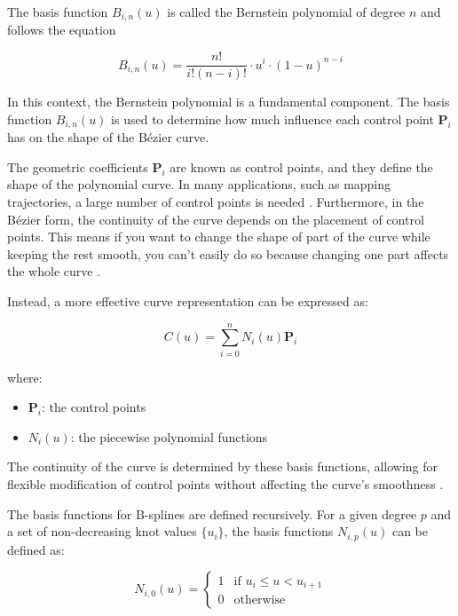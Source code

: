 The basis function \( B_{i,n}(u) \) is called the Bernstein polynomial of degree \( n \) and follows the equation

\begin{equation}
    B_{i,n}(u) = \frac{n!}{i!(n - i)!} \cdot u^i \cdot (1 - u)^{n - i} \label{}
\end{equation}

In this context, the Bernstein polynomial is a fundamental component. 
The basis function \( B_{i,n}(u) \) is used to determine how much influence each control 
point \( \mathbf{P}_i \) has on the shape of the Bézier curve.

The geometric coefficients \( \mathbf{P}_i \) are known as control points, and they define 
the shape of the polynomial curve. In many applications, such as mapping trajectories, 
a large number of control points is needed \cite{R28}.
Furthermore, in the Bézier form, the continuity of the curve depends on the placement of 
control points. This means if you want to change the shape of part of the curve while keeping 
the rest smooth, you can't easily do so because changing one part affects the whole curve \cite{R29}.

Instead, a more effective curve representation can be expressed as:

\begin{equation}
    C(u) = \sum_{i=0}^{n} N_i(u) \mathbf{P}_i
\end{equation}

where:
\begin{itemize}
    \item \( \mathbf{P}_i \): the control points
    \item \( N_i(u) \): the piecewise polynomial functions
\end{itemize}
The continuity of the curve is determined by these basis functions, allowing for flexible modification of 
control points without affecting the curve's smoothness \cite{R29}.

The basis functions for B-splines are defined recursively. For a given degree \( p \) and a set of non-decreasing knot values 
\( \{ u_i \} \), the basis functions \( N_{i,p}(u) \) can be defined as:

\begin{equation}
    N_{i,0}(u) = 
\begin{cases} 
1 & \text{if } u_i \leq u < u_{i+1} \\
0 & \text{otherwise}
\end{cases}
\end{equation}

